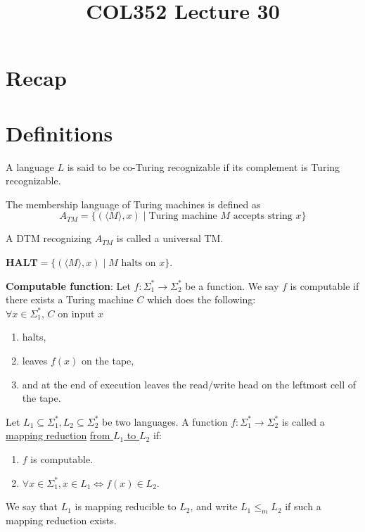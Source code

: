 \documentclass[a4paper]{article}
\title{\textbf{COL352 Lecture 30}}
\date{}
\newcommand{\nl}{\vspace{0.2cm}\\}
\newcommand{\mf}{\mathbf}
\begin{document}
\maketitle
\tableofcontents

\section{Recap}

\section{Definitions}

\begin{defn}
    A language $L$ is said to be co-Turing recognizable if its complement is Turing recognizable.
\end{defn}

\begin{defn}
    The membership language of Turing machines is defined as
    \[
        A_{TM} = \{(\langle M \rangle, x) \mid \text{Turing machine } M \text{ accepts string }x\}
    \]
\end{defn}

\begin{defn}
    A DTM recognizing $A_{TM}$ is called a universal TM.
\end{defn}

\begin{defn}
    $\mf{HALT} = \{(\langle M \rangle, x) \mid M \text{ halts on } x\}$.
\end{defn}

\begin{defn}
    \textbf{Computable function}: Let $f : \Sigma_1^* \to \Sigma_2^*$ be a function. We say $f$ is computable if there exists a Turing machine $C$ which does the following:\nl
    $\forall x \in \Sigma_1^*$, $C$ on input $x$
    \begin{enumerate}
        \item halts,
        \item leaves $f(x)$ on the tape,
        \item and at the end of execution leaves the read/write head on the leftmost cell of the tape.
    \end{enumerate}
\end{defn}

\begin{defn}
    Let $L_1 \subseteq \Sigma_1^*, L_2 \subseteq \Sigma_2^*$ be two languages. A function $f : \Sigma_1^* \to \Sigma_2^*$ is called a \underline{mapping reduction} \underline{from $L_1$ to $L_2$}
    if:
    \begin{enumerate}
        \item $f$ is computable.
        \item $\forall x \in \Sigma_1^*, x \in L_1 \iff f(x) \in L_2$.
    \end{enumerate}
    We say that $L_1$ is mapping reducible to $L_2$, and write $L_1 \le_m L_2$ if such a mapping reduction exists.
\end{defn}
\end{document}
